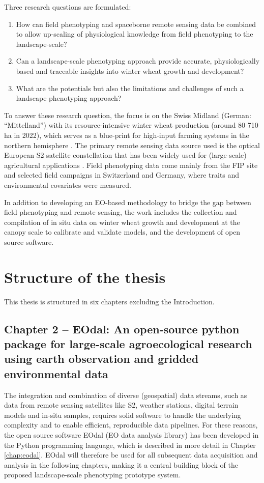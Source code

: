 Three research questions are formulated:

\begin{enumerate}
    \item How can field phenotyping and spaceborne remote sensing data be combined to allow up-scaling of physiological knowledge from field phenotyping to the landscape-scale?
    \item Can a landscape-scale phenotyping approach provide accurate, physiologically based and traceable insights into winter wheat growth and development?
    \item What are the potentials but also the limitations and challenges of such a landscape phenotyping approach?
\end{enumerate}

To answer these research question, the focus is on the Swiss Midland (German: ``Mittelland'') with its resource-intensive winter wheat production (around 80 710 ha in 2022), which serves as a blue-print for high-input farming systems in the northern hemisphere \citep{monfreda_farming_2008}. The primary remote sensing data source used is the optical European \gls{S2} satellite constellation that has been widely used for (large-scale) agricultural applications \citep{frampton_evaluating_2013,  veloso_understanding_2017, clevers_using_2017, perich_pixel-based_2023}. Field phenotyping data come mainly from the FIP site \citep{kirchgessner_eth_2017} and selected field campaigns in Switzerland and Germany, where traits and environmental covariates were measured.

In addition to developing an \gls{EO}-based methodology to bridge the gap between field phenotyping and remote sensing, the work includes the collection and compilation of in situ data on winter wheat growth and development at the canopy scale to calibrate and validate models, and the development of open source software.

\section{Structure of the thesis}

This thesis is structured in six chapters excluding the Introduction.

\subsection*{Chapter 2 -- EOdal: An open-source python package for large-scale agroecological research using earth observation and gridded environmental data}
The integration and combination of diverse (geospatial) data streams, such as data from remote sensing satellites like \gls{S2}, weather stations, digital terrain models and in-situ samples, requires solid software to handle the underlying complexity and to enable efficient, reproducible data pipelines. For these reasons, the open source software EOdal (\gls{EO} data analysis library) has been developed in the Python programming language, which is described in more detail in Chapter \ref{chap:eodal}. EOdal will therefore be used for all subsequent data acquisition and analysis in the following chapters, making it a central building block of the proposed landscape-scale phenotyping prototype system.

